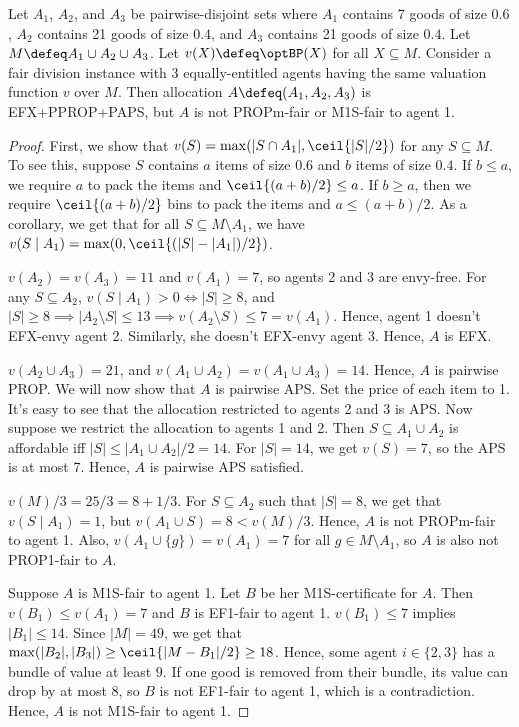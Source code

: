\begin{lemma}
\label{cex:paps-pprop-not-propm-binary-subadd}
Let $A_1$, $A_2$, and $A_3$ be pairwise-disjoint sets where
$A_1$ contains 7 goods of size $0.6$, $A_2$ contains 21 goods of size $0.4$,
and $A_3$ contains 21 goods of size $0.4$. Let $M \defeq A_1 \cup A_2 \cup A_3$.
Let $v(X) \defeq \optBP(X)$ for all $X \subseteq M$.
Consider a fair division instance with 3 equally-entitled agents
having the same valuation function $v$ over $M$.
Then allocation $A \defeq (A_1, A_2, A_3)$ is EFX+PPROP+PAPS,
but $A$ is not PROPm-fair or M1S-fair to agent 1.
\end{lemma}
\begin{proof}
First, we show that $v(S) = \max(|S \cap A_1|, \ceil{|S|/2})$ for any $S \subseteq M$.
To see this, suppose $S$ contains $a$ items of size $0.6$ and $b$ items of size $0.4$.
If $b \le a$, we require $a$ to pack the items and $\ceil{(a+b)/2} \le a$.
If $b \ge a$, then we require $\ceil{(a+b)/2}$ bins to pack the items and $a \le (a+b)/2$.
As a corollary, we get that for all $S \subseteq M \setminus A_1$,
we have $v(S \mid A_1) = \max(0, \ceil{(|S|-|A_1|)/2})$.

$v(A_2) = v(A_3) = 11$ and $v(A_1) = 7$, so agents 2 and 3 are envy-free.
For any $S \subseteq A_2$, $v(S \mid A_1) > 0 \iff |S| \ge 8$,
and $|S| \ge 8 \implies |A_2 \setminus S| \le 13 \implies v(A_2 \setminus S) \le 7 = v(A_1)$.
Hence, agent 1 doesn't EFX-envy agent 2. Similarly, she doesn't EFX-envy agent 3.
Hence, $A$ is EFX.

$v(A_2 \cup A_3) = 21$, and $v(A_1 \cup A_2) = v(A_1 \cup A_3) = 14$.
Hence, $A$ is pairwise PROP. We will now show that $A$ is pairwise APS.
Set the price of each item to 1.
It's easy to see that the allocation restricted to agents 2 and 3 is APS.
Now suppose we restrict the allocation to agents 1 and 2.
Then $S \subseteq A_1 \cup A_2$ is affordable iff $|S| \le |A_1 \cup A_2|/2 = 14$.
For $|S| = 14$, we get $v(S) = 7$, so the APS is at most 7.
Hence, $A$ is pairwise APS satisfied.

$v(M)/3 = 25/3 = 8 + 1/3$.
For $S \subseteq A_2$ such that $|S| = 8$, we get that $v(S \mid A_1) = 1$,
but $v(A_1 \cup S) = 8 < v(M)/3$. Hence, $A$ is not PROPm-fair to agent 1.
Also, $v(A_1 \cup \{g\}) = v(A_1) = 7$ for all $g \in M \setminus A_1$,
so $A$ is also not PROP1-fair to $A$.

Suppose $A$ is M1S-fair to agent 1. Let $B$ be her M1S-certificate for $A$.
Then $v(B_1) \le v(A_1) = 7$ and $B$ is EF1-fair to agent 1.
$v(B_1) \le 7$ implies $|B_1| \le 14$. Since $|M| = 49$, we get that
$\max(|B_2|, |B_3|) \ge \ceil{|M - B_1|/2} \ge 18$.
Hence, some agent $i \in \{2, 3\}$ has a bundle of value at least $9$.
If one good is removed from their bundle, its value can drop by at most $8$,
so $B$ is not EF1-fair to agent 1, which is a contradiction.
Hence, $A$ is not M1S-fair to agent 1.
\end{proof}

